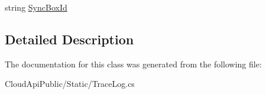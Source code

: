 \begin{DoxyCompactItemize}
\begin{DoxyCompactList}\small\item\em \end{DoxyCompactList}\item 
\hypertarget{class_cloud_api_public_1_1_static_1_1_entry_a4d710d3887b8d1617e8c3dcbed2c8d43}{string \hyperlink{class_cloud_api_public_1_1_static_1_1_entry_a4d710d3887b8d1617e8c3dcbed2c8d43}{Sync\-Box\-Id}}\label{class_cloud_api_public_1_1_static_1_1_entry_a4d710d3887b8d1617e8c3dcbed2c8d43}

\begin{DoxyCompactList}\small\item\em \end{DoxyCompactList}\end{DoxyCompactItemize}


\subsection{Detailed Description}


The documentation for this class was generated from the following file\-:\begin{DoxyCompactItemize}
\item 
Cloud\-Api\-Public/\-Static/Trace\-Log.\-cs\end{DoxyCompactItemize}
